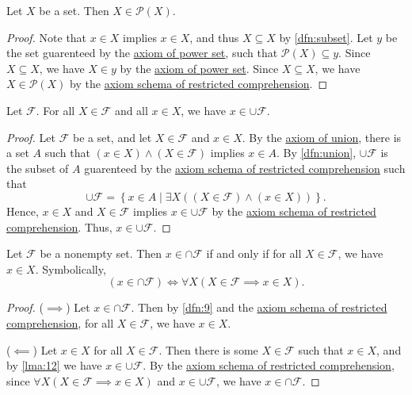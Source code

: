 \documentclass{article}
\begin{document}
\begin{lemma}\label{lma:11}
	Let $X$ be a set. Then $X\in \mathcal{P}(X)$.
\end{lemma}
\begin{proof}
	Note that $x\in X $ implies $x\in X $, and thus $X \subseteq X $ by \cref{dfn:subset}. Let $y$ be the set guarenteed by the \hyperref[axiom:powerset]{axiom of power set}, such that $\mathcal{P} (X ) \subseteq y$. Since $X \subseteq X$, we have $X \in y$ by the \hyperref[axiom:powerset]{axiom of power set}. Since $X\subseteq X $, we have $X \in \mathcal{P} (X)$ by the \hyperref[axiom:comprehension]{axiom schema of restricted comprehension}.
\end{proof}
\begin{lemma}\label{lma:12}
	Let $\mathcal{F} $. For all $X\in \mathcal{F} $ and all $x\in X$, we have $x\in \cup \mathcal{F} $.
\end{lemma}
\begin{proof}
	Let $\mathcal{F} $ be a set, and let $X\in \mathcal{F} $ and $x\in X$. By the \hyperref[axiom:union]{axiom of union}, there is a set $A$ such that $(x\in X) \land (X\in \mathcal{F} )$ implies $x\in A$. By \cref{dfn:union}, $\cup \mathcal{F} $ is the subset of $A$ guarenteed by the \hyperref[axiom:comprehension]{axiom schema of restricted comprehension} such that
	\[
		\cup \mathcal{F} =\left\{ x\in A\mid \exists X((X\in \mathcal{F} )\land (x\in X)) \right\} 
	.\]
	Hence, $x\in X$ and $X\in \mathcal{F} $ implies $x\in \cup \mathcal{F} $ by the \hyperref[axiom:comprehension]{axiom schema of restricted comprehension}. Thus, $x\in \cup \mathcal{F} $.
\end{proof}
\begin{lemma}\label{lma:13}
	Let $\mathcal{F} $ be a nonempty set. Then $x\in \cap \mathcal{F} $ if and only if for all $X\in \mathcal{F} $, we have $x\in X$. Symbolically,
	\[
		(x\in \cap \mathcal{F} ) \iff \forall X(X\in \mathcal{F} \implies x\in X)
	.\]
\end{lemma}
\begin{proof}
	($\implies $) Let $x\in \cap\mathcal{F} $. Then by \cref{dfn:9} and the \hyperref[axiom:comprehension]{axiom schema of restricted comprehension}, for all $X\in \mathcal{F} $, we have $x\in X$.
	
	($\impliedby $) Let $x\in X$ for all $X\in \mathcal{F} $. Then there is some $X\in \mathcal{F} $ such that $x\in X$, and by \cref{lma:12} we have $x\in \cup \mathcal{F} $. By the \hyperref[axiom:comprehension]{axiom schema of restricted comprehension}, since $\forall X(X\in \mathcal{F} \implies x\in X)$ and $x\in \cup \mathcal{F} $, we have $x\in \cap \mathcal{F} $.
\end{proof}
\end{document}
